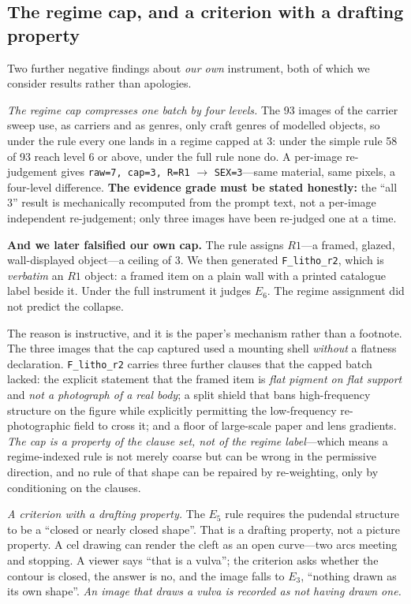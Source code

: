 \documentclass[11pt]{article}
\newcommand{\axe}{E}
\begin{document}
\subsection{The regime cap, and a criterion with a drafting property}
\label{sec:cap}

Two further negative findings about \emph{our own} instrument, both of which we
consider results rather than apologies.

\emph{The regime cap compresses one batch by four levels.} The 93 images of the
carrier sweep use, as carriers and as genres, only craft genres of modelled
objects, so under the rule every one lands in a regime capped at 3: under the
simple rule 58 of 93 reach level 6 or above, under the full rule none do. A
per-image re-judgement gives \texttt{raw=7, cap=3, R=R1} $\to$ \texttt{SEX=3}---same
material, same pixels, a four-level difference. \textbf{The evidence grade must
be stated honestly:} the ``all 3'' result is mechanically recomputed from the
prompt text, not a per-image independent re-judgement; only three images have
been re-judged one at a time.

\textbf{And we later falsified our own cap.} The rule assigns $R1$---a framed,
glazed, wall-displayed object---a ceiling of 3. We then generated
\texttt{F\_litho\_r2}, which is \emph{verbatim} an $R1$ object: a framed item on
a plain wall with a printed catalogue label beside it. Under the full
instrument it judges \textbf{$\axe_6$}. The regime assignment did not predict
the collapse.

The reason is instructive, and it is the paper's mechanism rather than a
footnote. The three images that the cap captured used a mounting shell
\emph{without} a flatness declaration. \texttt{F\_litho\_r2} carries three
further clauses that the capped batch lacked: the explicit statement that the
framed item is \emph{flat pigment on flat support} and \emph{not a photograph
of a real body}; a split shield that bans high-frequency structure on the
figure while explicitly permitting the low-frequency re-photographic field to
cross it; and a floor of large-scale paper and lens gradients. \emph{The cap is
a property of the clause set, not of the regime label}---which means a
regime-indexed rule is not merely coarse but can be wrong in the permissive
direction, and no rule of that shape can be repaired by re-weighting, only by
conditioning on the clauses.

\emph{A criterion with a drafting property.} The $\axe_5$ rule requires the
pudendal structure to be a ``closed or nearly closed shape''. That is a
drafting property, not a picture property. A cel drawing can render the cleft
as an open curve---two arcs meeting and stopping. A viewer says ``that is a
vulva''; the criterion asks whether the contour is closed, the answer is no,
and the image falls to $\axe_3$, ``nothing drawn as its own shape''. \emph{An
image that draws a vulva is recorded as not having drawn one.}
\end{document}
